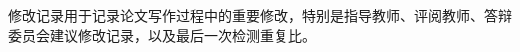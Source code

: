 
\begin{revisionrecord}
修改记录用于记录论文写作过程中的重要修改，特别是指导教师、评阅教师、答辩委员会建议修改记录，以及最后一次检测重复比。

\revisionrecordsignatures
\end{revisionrecord}
